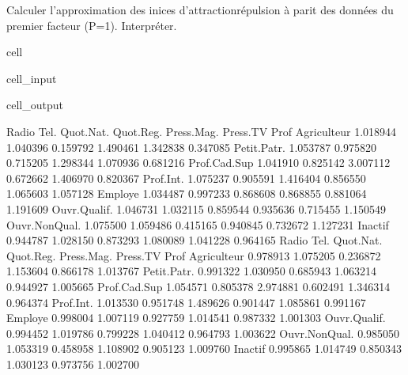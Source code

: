 \documentclass[letterpaper,10pt,french]{sphinxmanual}
\begin{document}
\sphinxAtStartPar
Calculer l’approximation des inices d’attraction\sphinxhyphen{}répulsion à parit des données du premier facteur (P=1). Interpréter.

\begin{sphinxuseclass}{cell}
\begin{sphinxuseclass}{cell_input}
\begin{sphinxVerbatim}[commandchars=\\\{\}]
\end{sphinxVerbatim}

\end{sphinxuseclass}
\begin{sphinxuseclass}{cell_output}
\begin{sphinxVerbatim}[commandchars=\\\{\}]
                   Radio      Tel.  Quot.Nat.  Quot.Reg.  Press.Mag.  Press.TV
Prof                                                                          
Agriculteur     1.018944  1.040396   0.159792   1.490461    1.342838  0.347085
Petit.Patr.     1.053787  0.975820   0.715205   1.298344    1.070936  0.681216
Prof.Cad.Sup    1.041910  0.825142   3.007112   0.672662    1.406970  0.820367
Prof.Int.       1.075237  0.905591   1.416404   0.856550    1.065603  1.057128
Employe         1.034487  0.997233   0.868608   0.868855    0.881064  1.191609
Ouvr.Qualif.    1.046731  1.032115   0.859544   0.935636    0.715455  1.150549
Ouvr.Non\PYGZhy{}Qual.  1.075500  1.059486   0.415165   0.940845    0.732672  1.127231
Inactif         0.944787  1.028150   0.873293   1.080089    1.041228  0.964165
                   Radio      Tel.  Quot.Nat.  Quot.Reg.  Press.Mag.  Press.TV
Prof                                                                          
Agriculteur     0.978913  1.075205   0.236872   1.153604    0.866178  1.013767
Petit.Patr.     0.991322  1.030950   0.685943   1.063214    0.944927  1.005665
Prof.Cad.Sup    1.054571  0.805378   2.974881   0.602491    1.346314  0.964374
Prof.Int.       1.013530  0.951748   1.489626   0.901447    1.085861  0.991167
Employe         0.998004  1.007119   0.927759   1.014541    0.987332  1.001303
Ouvr.Qualif.    0.994452  1.019786   0.799228   1.040412    0.964793  1.003622
Ouvr.Non\PYGZhy{}Qual.  0.985050  1.053319   0.458958   1.108902    0.905123  1.009760
Inactif         0.995865  1.014749   0.850343   1.030123    0.973756  1.002700
\end{sphinxVerbatim}

\end{sphinxuseclass}
\end{sphinxuseclass}
\end{document}
